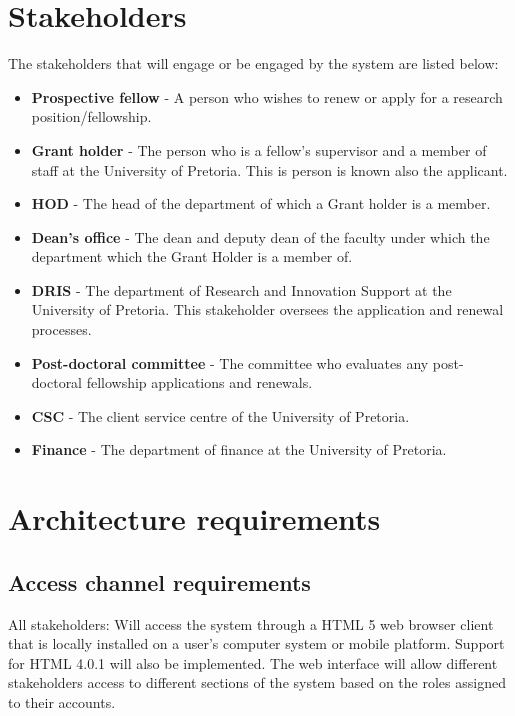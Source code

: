 \documentclass[12pt]{article}
\begin{document}
	\vspace{0.5in}
	
	
	\newpage
		\section{Stakeholders} %
		\vspace{0.2in}
		
		The stakeholders that will engage or be engaged by the system are listed below:
		
		\begin{itemize}
			\item \textbf{Prospective fellow} - A person who wishes to renew or apply for a research position/fellowship.
			\item \textbf{Grant holder} - The person who is a fellow's supervisor and a member of staff at the University of Pretoria. This is person is known also the applicant.
			\item \textbf{HOD} - The head of the department of which a Grant holder is a member.
			\item \textbf{Dean's office} - The dean and deputy dean of the faculty under which the department which the Grant Holder is a member of.
			\item \textbf{DRIS} - The department of Research and Innovation Support at the University of Pretoria. This stakeholder oversees the application and renewal processes.
			\item \textbf{Post-doctoral committee} - The committee who evaluates any post-doctoral fellowship applications and renewals.
			\item \textbf{CSC} - The client service centre of the University of Pretoria.
			\item \textbf{Finance} - The department of finance at the University of Pretoria.		
		\end{itemize}	
		
		\vspace{0.5in}
	
	\newpage
	\section{Architecture requirements}
		\subsection{Access channel requirements} %
		\vspace{0.2in}
		All stakeholders: Will access the system through a HTML 5 web browser client that is locally installed on a user's computer system or mobile platform. Support for HTML 4.0.1 will also be implemented. The web interface will allow different stakeholders access to different sections of the system based on the roles assigned to their accounts.   
\end{document}

